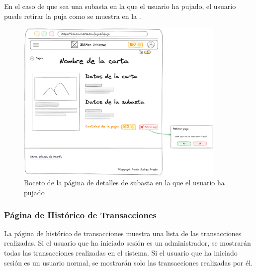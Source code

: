 En el caso de que sea una subasta en la que el usuario ha pujado, el usuario puede retirar la puja como se muestra en la .
\begin{figure}[H]
    \centering
    \includegraphics[width=0.9\textwidth]{figures/6-Analisis/6-Interfaz/prototipos/detalle-puja.png}
    \caption{Boceto de la página de detalles de subasta en la que el usuario ha pujado}
    \label{fig:p_auction_details_bid}
    \hypertarget{fig:p_auction_details_bid}{}
\end{figure}


\subsubsection{Página de Histórico de Transacciones}
La página de histórico de transacciones muestra una lista de las transacciones realizadas.
Si el usuario que ha iniciado sesión es un administrador, se mostrarán todas las transacciones realizadas en el sistema.
Si el usuario que ha iniciado sesión es un usuario normal, se mostrarán solo las transacciones realizadas por él.

